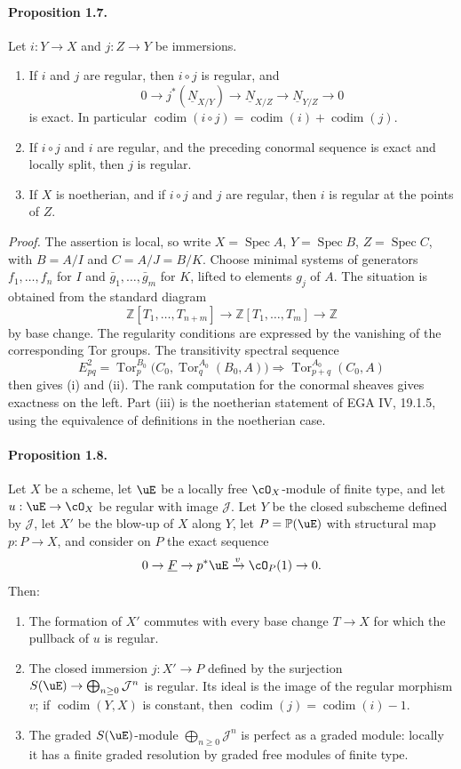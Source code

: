 \documentclass[11pt]{article}
\theoremstyle{plain}
\theoremstyle{definition}
\theoremstyle{remark}
\newcommand{\bbP}{\mathbb P}
\newcommand{\ZZ}{\mathbb Z}
\newcommand{\cJ}{\mathcal J}\newcommand{\cK}{\mathcal K}\newcommand{\cL}{\mathcal L}
\DeclareMathOperator{\Spec}{Spec}
\DeclareMathOperator{\Tor}{Tor}
\DeclareMathOperator{\codim}{codim}
\providecommand{\codim}{\operatorname{codim}}
\providecommand{\xto}[1]{\xrightarrow{#1}}
\providecommand{\uF}{\underline{F}}
\begin{document}
\paragraph{Proposition 1.7.} Let $i:Y\to X$ and $j:Z\to Y$ be immersions.
\begin{enumerate}[label=\roman*)]
\item If $i$ and $j$ are regular, then $i\circ j$ is regular, and
\[
0\to j^*(\underline N_{X/Y})\to \underline N_{X/Z}\to \underline N_{Y/Z}\to0
\]
is exact. In particular $\codim(i\circ j)=\codim(i)+\codim(j)$.
\item If $i\circ j$ and $i$ are regular, and the preceding conormal sequence is exact and locally split, then $j$ is regular.
\item If $X$ is noetherian, and if $i\circ j$ and $j$ are regular, then $i$ is regular at the points of $Z$.
\end{enumerate}

\emph{Proof.} The assertion is local, so write $X=\Spec A$, $Y=\Spec B$, $Z=\Spec C$, with $B=A/I$ and $C=A/J=B/K$. Choose minimal systems of generators $f_1,\ldots,f_n$ for $I$ and $\bar g_1,\ldots,\bar g_m$ for $K$, lifted to elements $g_j$ of $A$. The situation is obtained from the standard diagram
\[
\ZZ[T_1,\ldots,T_{n+m}]\to \ZZ[T_1,\ldots,T_m]\to \ZZ
\]
by base change. The regularity conditions are expressed by the vanishing of the corresponding Tor groups. The transitivity spectral sequence
\[
E^2_{pq}=\Tor_p^{B_0}\bigl(C_0,\Tor_q^{A_0}(B_0,A)\bigr)\Longrightarrow \Tor_{p+q}^{A_0}(C_0,A)
\]
then gives (i) and (ii). The rank computation for the conormal sheaves gives exactness on the left. Part (iii) is the noetherian statement of EGA IV, 19.1.5, using the equivalence of definitions in the noetherian case.

\paragraph{Proposition 1.8.} Let $X$ be a scheme, let $\uE$ be a locally free $\cO_X$-module of finite type, and let $u:\uE\to\cO_X$ be regular with image $\cJ$. Let $Y$ be the closed subscheme defined by $\cJ$, let $X'$ be the blow-up of $X$ along $Y$, let $P=\bbP(\uE)$ with structural map $p:P\to X$, and consider on $P$ the exact sequence
\[
0\to\uF\to p^*\uE\xto{v}\cO_P(1)\to0.
\]
Then:
\begin{enumerate}[label=\roman*)]
\item The formation of $X'$ commutes with every base change $T\to X$ for which the pullback of $u$ is regular.
\item The closed immersion $j:X'\to P$ defined by the surjection $S(\uE)\to\bigoplus_{n\geq0}\cJ^n$ is regular. Its ideal is the image of the regular morphism $v$; if $\codim(Y,X)$ is constant, then $\codim(j)=\codim(i)-1$.
\item The graded $S(\uE)$-module $\bigoplus_{n\geq0}\cJ^n$ is perfect as a graded module: locally it has a finite graded resolution by graded free modules of finite type.
\end{enumerate}
\end{document}
